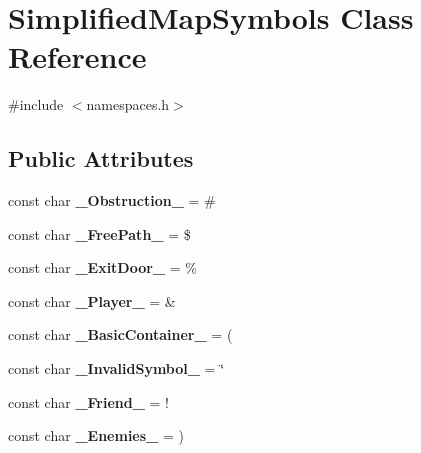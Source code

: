 \hypertarget{class_simplified_map_symbols}{}\section{Simplified\+Map\+Symbols Class Reference}
\label{class_simplified_map_symbols}


{\ttfamily \#include $<$namespaces.\+h$>$}

\subsection*{Public Attributes}
\begin{DoxyCompactItemize}
\item 
\hypertarget{class_simplified_map_symbols_a0375f8c694211215144c286732e9130b}{}\label{class_simplified_map_symbols_a0375f8c694211215144c286732e9130b} 
const char {\bfseries \+\_\+\+Obstruction\+\_\+} = \textquotesingle{}\#\textquotesingle{}
\item 
\hypertarget{class_simplified_map_symbols_a5bf54ef0bcc8ba8d7533d4905d918648}{}\label{class_simplified_map_symbols_a5bf54ef0bcc8ba8d7533d4905d918648} 
const char {\bfseries \+\_\+\+Free\+Path\+\_\+} = \textquotesingle{}\$\textquotesingle{}
\item 
\hypertarget{class_simplified_map_symbols_a9486d70c0c2d428f9aac18156c69abde}{}\label{class_simplified_map_symbols_a9486d70c0c2d428f9aac18156c69abde} 
const char {\bfseries \+\_\+\+Exit\+Door\+\_\+} = \textquotesingle{}\%\textquotesingle{}
\item 
\hypertarget{class_simplified_map_symbols_a3eb7298652a2218d634180dc846723be}{}\label{class_simplified_map_symbols_a3eb7298652a2218d634180dc846723be} 
const char {\bfseries \+\_\+\+Player\+\_\+} = \textquotesingle{}\&\textquotesingle{}
\item 
\hypertarget{class_simplified_map_symbols_a9712578714bec8ede61f9a34d3ef6926}{}\label{class_simplified_map_symbols_a9712578714bec8ede61f9a34d3ef6926} 
const char {\bfseries \+\_\+\+Basic\+Container\+\_\+} = \textquotesingle{}(\textquotesingle{}
\item 
\hypertarget{class_simplified_map_symbols_a678a9426c3839c5adf4125833287ce5d}{}\label{class_simplified_map_symbols_a678a9426c3839c5adf4125833287ce5d} 
const char {\bfseries \+\_\+\+Invalid\+Symbol\+\_\+} = \textquotesingle{}\char`\"{}\textquotesingle{}
\item 
\hypertarget{class_simplified_map_symbols_a5ec134f82b1844689f301c059b329635}{}\label{class_simplified_map_symbols_a5ec134f82b1844689f301c059b329635} 
const char {\bfseries \+\_\+\+Friend\+\_\+} = \textquotesingle{}!\textquotesingle{}
\item 
\hypertarget{class_simplified_map_symbols_a04ea6cefb75a9cd095825a556bdc8ea5}{}\label{class_simplified_map_symbols_a04ea6cefb75a9cd095825a556bdc8ea5} 
const char {\bfseries \+\_\+\+Enemies\+\_\+} = \textquotesingle{})\textquotesingle{}
\end{DoxyCompactItemize}


